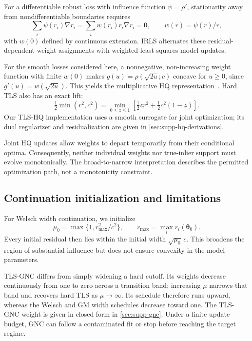 \documentclass[runningheads]{llncs}
\newcommand{\bzero}{\mathbf{0}}
\newcommand{\btheta}{\boldsymbol\theta}
\begin{document}
For a differentiable robust loss with influence function
$\psi=\rho'$, stationarity away from nondifferentiable boundaries
requires
\begin{equation}
	\sum_i\psi(r_i)\nabla r_i
	=\sum_iw(r_i)r_i\nabla r_i=\bzero,
	\qquad w(r)=\psi(r)/r,
	\label{eq:robust-stationarity}
\end{equation}
with $w(0)$ defined by continuous extension.
IRLS alternates these residual-dependent weight assignments with
weighted least-squares model updates.

For the smooth losses considered here, a nonnegative,
non-increasing weight function with finite $w(0)$ makes
$g(u)=\rho(\sqrt{2u};c)$ concave for $u\ge0$, since
$g'(u)=w(\sqrt{2u})$. This yields the multiplicative
HQ representation~\cite{BlackRangarajan1996,ZachBourmaud2018}.
Hard TLS also has an exact lift:
\begin{equation}
	\tfrac12\min(r^2,c^2)
	=\min_{0\le z\le1}
	\left[\tfrac12zr^2+\tfrac12c^2(1-z)\right].
\end{equation}
Our TLS-HQ implementation uses a smooth surrogate for joint
optimization; its dual regularizer and residualization are given
in \cref{sec:supp-hq-derivations}.

Joint HQ updates allow weights to depart temporarily from their
conditional optima. Consequently, neither individual weights nor
true-inlier support must evolve monotonically.
The broad-to-narrow interpretation describes the permitted
optimization path, not a monotonicity constraint.

\subsection{Continuation initialization and limitations}

For Welsch width continuation, we initialize
\begin{equation}
	\mu_0=\max\{1,r_{\max}^2/c^2\},
	\qquad r_{\max}=\max_i r_i(\btheta_0).
\end{equation}
Every initial residual then lies within the initial width
$\sqrt{\mu_0}\,c$. This broadens the region of substantial influence
but does not ensure convexity in the model parameters.

TLS-GNC differs from simply widening a hard cutoff.
Its weights decrease continuously from one to zero across a
transition band; increasing $\mu$ narrows that band and recovers
hard TLS as $\mu\to\infty$. Its schedule therefore runs upward,
whereas the Welsch and GM width schedules decrease toward one.
The TLS-GNC weight is given in closed form in \cref{sec:supp-gnc}.
Under a finite update budget, GNC can follow a contaminated fit
or stop before reaching the target regime.
\end{document}
